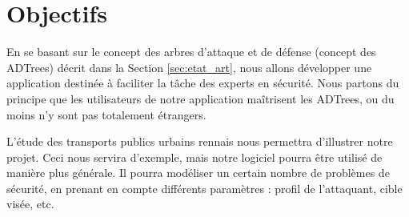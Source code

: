 \section{Objectifs}
	\label{sec:objectifs}

	En se basant sur le concept des arbres d’attaque et de défense (concept des ADTrees) décrit dans la Section \ref{sec:etat_art}, nous allons développer une application destinée à faciliter la tâche des experts en sécurité. Nous partons du principe que les utilisateurs de notre application maîtrisent les ADTrees, ou du moins n’y sont pas totalement étrangers.

	L’étude des transports publics urbains rennais nous permettra d’illustrer notre projet. Ceci nous servira d’exemple, mais notre logiciel pourra être utilisé de manière plus générale. Il pourra modéliser un certain nombre de problèmes de sécurité, en prenant en compte différents paramètres : profil de l'attaquant, cible visée, etc.
